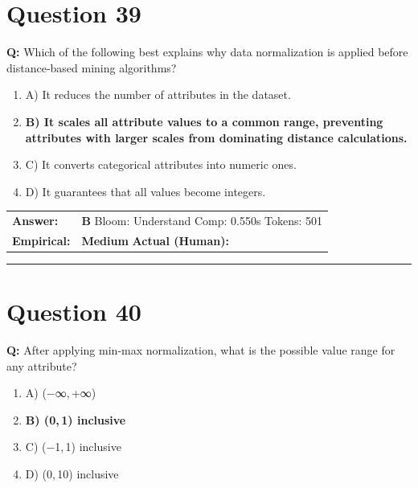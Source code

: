 \documentclass[9pt]{article}
\begin{document}
\section*{Question 39}

\textbf{Q:} Which of the following best explains why data normalization is applied before distance‑based mining algorithms?

\begin{enumerate}[label=\textbf{\alph{*})}, nosep]
    \item A) It reduces the number of attributes in the dataset.
    \item \textbf{B) It scales all attribute values to a common range, preventing attributes with larger scales from dominating distance calculations.} %
    \item C) It converts categorical attributes into numeric ones.
    \item D) It guarantees that all values become integers.

\end{enumerate}

\begin{tabular}{@{}l p{10.5cm}@{}}
\textbf{Answer:} & \textbf{B} \hspace{1em} Bloom: Understand \hspace{1em} Comp: 0.550s \hspace{1em} Tokens: 501 \\
\textbf{Empirical:} & \textbf{Medium} \hspace{1em} \textbf{Actual (Human):} \underline{\hspace{5cm}}
\end{tabular}

\vspace{0.2cm}
\rule{\textwidth}{0.4pt}
\vspace{0.2cm}


\section*{Question 40}

\textbf{Q:} After applying min‑max normalization, what is the possible value range for any attribute?

\begin{enumerate}[label=\textbf{\alph{*})}, nosep]
    \item A) (−∞, +∞)
    \item \textbf{B) (0, 1) inclusive} %
    \item C) (−1, 1) inclusive
    \item D) (0, 10) inclusive

\end{enumerate}
\end{document}

